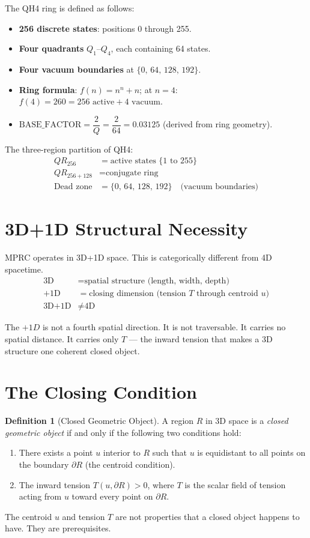 \documentclass[12pt,a4paper]{article}
\theoremstyle{definition}
\newtheorem{definition}{Definition}[section]
\begin{document}
The QH4 ring is defined as follows:
\begin{itemize}[noitemsep]
  \item \textbf{256 discrete states}: positions 0 through 255.
  \item \textbf{Four quadrants} $Q_1$--$Q_4$, each containing 64 states.
  \item \textbf{Four vacuum boundaries} at $\{0,\,64,\,128,\,192\}$.
  \item \textbf{Ring formula}: $f(n) = n^{n} + n$; at $n=4$: $f(4) = 260 = 256\text{ active} + 4\text{ vacuum}$.
  \item $\mathrm{BASE\_FACTOR} = \dfrac{2}{Q} = \dfrac{2}{64} = 0.03125$ (derived from ring geometry).
\end{itemize}

The three-region partition of QH4:
\begin{align*}
  QR_{256}      &= \text{active states } \{1 \text{ to } 255\}\\
  QR_{256+128}  &= \text{conjugate ring}\\
  \text{Dead zone} &= \{0,\,64,\,128,\,192\} \quad\text{(vacuum boundaries)}
\end{align*}

\section{3D+1D Structural Necessity}

MPRC operates in 3D+1D space. This is categorically different from 4D spacetime.
\begin{align*}
  \text{3D}   &= \text{spatial structure (length, width, depth)}\\
  +\text{1D}  &= \text{closing dimension (tension } T \text{ through centroid } u\text{)}\\
  \text{3D+1D} &\neq \text{4D}
\end{align*}

The $+1D$ is not a fourth spatial direction. It is not traversable. It carries no spatial distance. It carries only $T$ --- the inward tension that makes a 3D structure one coherent closed object.

\section{The Closing Condition}

\begin{definition}[Closed Geometric Object]
A region $R$ in 3D space is a \emph{closed geometric object} if and only if the following two conditions hold:
\begin{enumerate}[label=(\roman*)]
  \item There exists a point $u$ interior to $R$ such that $u$ is equidistant to all points on the boundary $\partial R$ (the centroid condition).
  \item The inward tension $T(u,\partial R) > 0$, where $T$ is the scalar field of tension acting from $u$ toward every point on $\partial R$.
\end{enumerate}
The centroid $u$ and tension $T$ are not properties that a closed object happens to have. They are prerequisites.
\end{definition}
\end{document}
